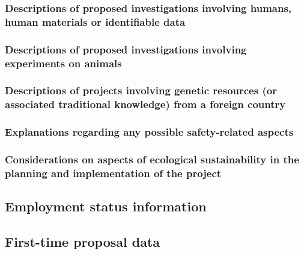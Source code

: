 \documentclass{scrartcl}
\begin{document}
\subsubsection{Descriptions of proposed investigations involving humans, human materials or identifiable data}

\subsubsection{Descriptions of proposed investigations involving experiments on animals}

\subsubsection{Descriptions of projects involving genetic resources (or associated traditional knowledge) from a foreign country}

\subsubsection{Explanations regarding any possible safety-related aspects}



\subsubsection{Considerations on aspects of ecological sustainability in the planning and implementation of the project}

\subsection{Employment status information}

\subsection{First-time proposal data}
\end{document}

